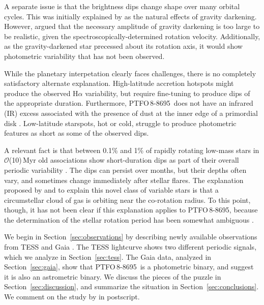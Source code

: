 \documentclass[12pt,twocolumn,tighten]{aastex62}
\newcommand{\ptfo}{PTFO$\,$8-8695}
\begin{document}
A separate issue is that the brightness dips change shape over many
orbital cycles. This was initially explained by
\cite{barnes_measurement_2013} as the natural effects of gravity
darkening.  However, \cite{howarth_reappraisal_2016} argued that the
necessary amplitude of gravity darkening is too large to be realistic,
given the spectroscopically-determined rotation velocity.
Additionally, as the gravity-darkened star precessed about its
rotation axis, it would show photometric variability that has not been
observed.

While the planetary interpetation clearly faces challenges, there is
no completely satisfactory alternate explanation.  High-latitude
accretion hotspots might produce the observed H$\alpha$ variability,
but require fine-tuning to produce dips of the appropriate duration.
Furthermore, \ptfo\ does not have an infrared (IR) excess associated
with the presence of dust at the inner edge of a primordial disk
\citep[{\it e.g.},][Figure~18]{yu_tests_2015}.  Low-latitude
starspots, hot or cold, struggle to produce photometric features as
short as some of the observed dips.

A relevant fact is that between 0.1\% and 1\% of rapidly rotating
low-mass stars in $\mathcal{O}$(10)$\,$Myr old associations show
short-duration dips as part of their overall periodic variability
\citep{rebull_usco_2018}.  The dips can persist over months, but their
depths often vary, and sometimes change immediately after stellar
flares.  The explanation proposed by \citet{stauffer_orbiting_2017}
and \citet{david_transient_2017} to explain this novel class of
variable stars is that a circumstellar cloud of gas is orbiting near
the co-rotation radius.  To this point, though, it has not been clear
if this explanation applies to \ptfo, because the determination of the
stellar rotation period has been somewhat ambiguous
\citep{van_eyken_ptf_2012,koen_multicolour_2015,raetz_yeti_2016}.

We begin in Section~\ref{sec:observations} by describing newly
available observations from TESS \citep{ricker_transiting_2015} and
Gaia \citep{gaia_collaboration_gaia_2018}.  The TESS lightcurve shows
two different periodic signals, which we analyze in
Section~\ref{sec:tess}.  The Gaia data, analyzed in
Section~\ref{sec:gaia}, show that \ptfo\ is a photometric binary, and
suggest it is also an astrometric binary.  We discuss the pieces of
the puzzle in Section~\ref{sec:discussion}, and summarize the
situation in Section~\ref{sec:conclusions}.  We comment on the study
by \citet{koen_2020} in postscript.
\end{document}
